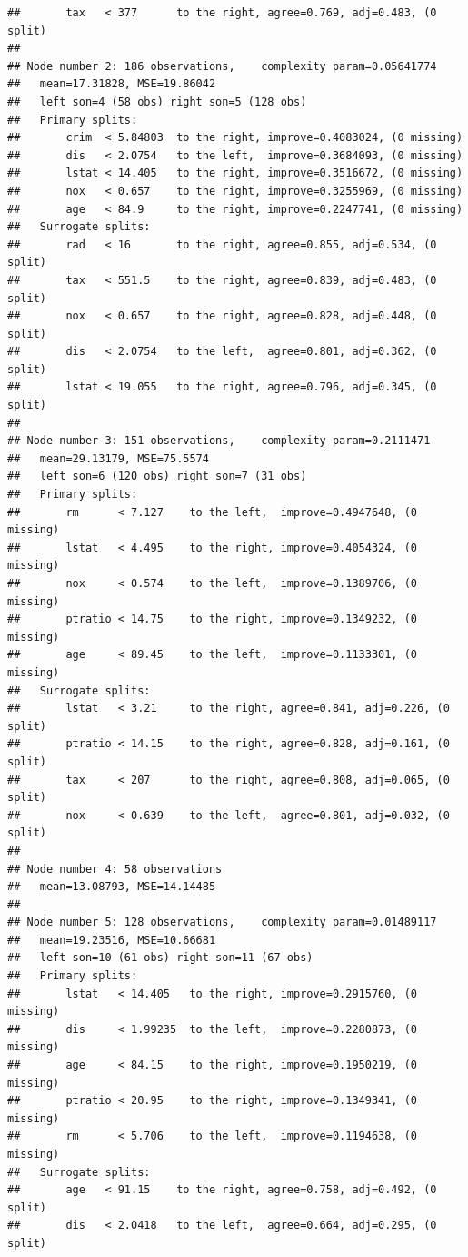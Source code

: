 \documentclass[]{book}
\theoremstyle{plain}
\theoremstyle{definition}
\theoremstyle{definition}
\theoremstyle{definition}
\theoremstyle{definition}
\theoremstyle{remark}
\begin{document}
\begin{verbatim}
##       tax   < 377      to the right, agree=0.769, adj=0.483, (0 split)
## 
## Node number 2: 186 observations,    complexity param=0.05641774
##   mean=17.31828, MSE=19.86042 
##   left son=4 (58 obs) right son=5 (128 obs)
##   Primary splits:
##       crim  < 5.84803  to the right, improve=0.4083024, (0 missing)
##       dis   < 2.0754   to the left,  improve=0.3684093, (0 missing)
##       lstat < 14.405   to the right, improve=0.3516672, (0 missing)
##       nox   < 0.657    to the right, improve=0.3255969, (0 missing)
##       age   < 84.9     to the right, improve=0.2247741, (0 missing)
##   Surrogate splits:
##       rad   < 16       to the right, agree=0.855, adj=0.534, (0 split)
##       tax   < 551.5    to the right, agree=0.839, adj=0.483, (0 split)
##       nox   < 0.657    to the right, agree=0.828, adj=0.448, (0 split)
##       dis   < 2.0754   to the left,  agree=0.801, adj=0.362, (0 split)
##       lstat < 19.055   to the right, agree=0.796, adj=0.345, (0 split)
## 
## Node number 3: 151 observations,    complexity param=0.2111471
##   mean=29.13179, MSE=75.5574 
##   left son=6 (120 obs) right son=7 (31 obs)
##   Primary splits:
##       rm      < 7.127    to the left,  improve=0.4947648, (0 missing)
##       lstat   < 4.495    to the right, improve=0.4054324, (0 missing)
##       nox     < 0.574    to the left,  improve=0.1389706, (0 missing)
##       ptratio < 14.75    to the right, improve=0.1349232, (0 missing)
##       age     < 89.45    to the left,  improve=0.1133301, (0 missing)
##   Surrogate splits:
##       lstat   < 3.21     to the right, agree=0.841, adj=0.226, (0 split)
##       ptratio < 14.15    to the right, agree=0.828, adj=0.161, (0 split)
##       tax     < 207      to the right, agree=0.808, adj=0.065, (0 split)
##       nox     < 0.639    to the left,  agree=0.801, adj=0.032, (0 split)
## 
## Node number 4: 58 observations
##   mean=13.08793, MSE=14.14485 
## 
## Node number 5: 128 observations,    complexity param=0.01489117
##   mean=19.23516, MSE=10.66681 
##   left son=10 (61 obs) right son=11 (67 obs)
##   Primary splits:
##       lstat   < 14.405   to the right, improve=0.2915760, (0 missing)
##       dis     < 1.99235  to the left,  improve=0.2280873, (0 missing)
##       age     < 84.15    to the right, improve=0.1950219, (0 missing)
##       ptratio < 20.95    to the right, improve=0.1349341, (0 missing)
##       rm      < 5.706    to the left,  improve=0.1194638, (0 missing)
##   Surrogate splits:
##       age   < 91.15    to the right, agree=0.758, adj=0.492, (0 split)
##       dis   < 2.0418   to the left,  agree=0.664, adj=0.295, (0 split)

\end{verbatim}
\end{document}
